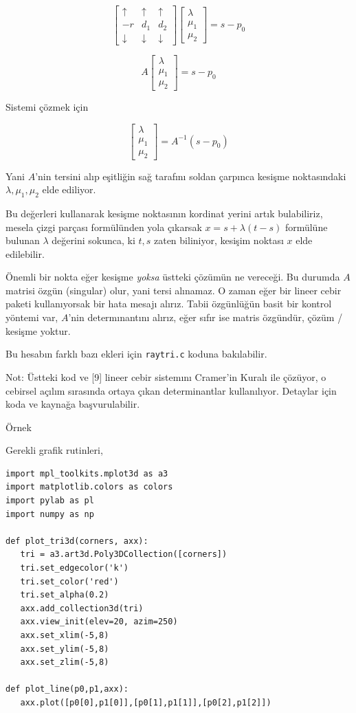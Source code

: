 \documentclass[12pt,fleqn]{article}\usepackage{../../common}
\begin{document}
$$
\left[\begin{array}{ccc}
\uparrow & \uparrow & \uparrow  \\
 -r & d_1 & d_2 \\
\downarrow & \downarrow & \downarrow 
\end{array}\right]
\left[\begin{array}{ccc}
\lambda \\ \mu_1 \\ \mu_2 
\end{array}\right] = s - p_0
$$

$$
A
\left[\begin{array}{ccc}
\lambda \\ \mu_1 \\ \mu_2 
\end{array}\right] = s - p_0
$$

Sistemi çözmek için

$$
\left[\begin{array}{ccc}
\lambda \\ \mu_1 \\ \mu_2 
\end{array}\right] = A^{-1} (s - p_0)
$$

Yani $A$'nin tersini alıp eşitliğin sağ tarafını soldan çarpınca kesişme
noktasındaki $\lambda,\mu_1,\mu_2$ elde ediliyor.

Bu değerleri kullanarak kesişme noktasının kordinat yerini artık bulabiliriz,
mesela çizgi parçası formülünden yola çıkarsak $x = s + \lambda (t-s)$ formülüne
bulunan $\lambda$ değerini sokunca, ki $t,s$ zaten biliniyor, kesişim noktası
$x$ elde edilebilir.

Önemli bir nokta eğer kesişme {\em yoksa} üstteki çözümün ne vereceği. Bu
durumda $A$ matrisi özgün (singular) olur, yani tersi alınamaz. O zaman eğer bir
lineer cebir paketi kullanıyorsak bir hata mesajı alırız. Tabii özgünlüğün basit
bir kontrol yöntemi var, $A$'nin determınantını alırız, eğer sıfır ise matris
özgündür, çözüm / kesişme yoktur.

Bu hesabın farklı bazı ekleri için  \verb!raytri.c! koduna bakılabilir.

Not: Üstteki kod ve [9] lineer cebir sistemını Cramer'in Kuralı ile çözüyor, o
cebirsel açılım sırasında ortaya çıkan determinantlar kullanılıyor. Detaylar
için koda ve kaynağa başvurulabilir.

Örnek

Gerekli grafik rutinleri,

\begin{verbatim}
import mpl_toolkits.mplot3d as a3
import matplotlib.colors as colors
import pylab as pl
import numpy as np

def plot_tri3d(corners, axx):
   tri = a3.art3d.Poly3DCollection([corners])   
   tri.set_edgecolor('k')
   tri.set_color('red')
   tri.set_alpha(0.2)
   axx.add_collection3d(tri)
   axx.view_init(elev=20, azim=250)
   axx.set_xlim(-5,8)
   axx.set_ylim(-5,8)
   axx.set_zlim(-5,8)

def plot_line(p0,p1,axx):
   axx.plot([p0[0],p1[0]],[p0[1],p1[1]],[p0[2],p1[2]])
   
\end{verbatim}
\end{document}
